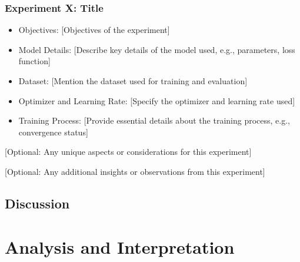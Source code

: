\begin{frame}
    \frametitle{Experiment X: Title}

    \begin{itemize}
        \item Objectives: [Objectives of the experiment]
        \item Model Details: [Describe key details of the model used, e.g., parameters, loss function]
        \item Dataset: [Mention the dataset used for training and evaluation]
        \item Optimizer and Learning Rate: [Specify the optimizer and learning rate used]
        \item Training Process: [Provide essential details about the training process, e.g., convergence status]
    \end{itemize}

    [Optional: Any unique aspects or considerations for this experiment]


    [Optional: Any additional insights or observations from this experiment]

\end{frame}

\subsection{Discussion}

\section{Analysis and Interpretation} \label{sec:res-analysis}

